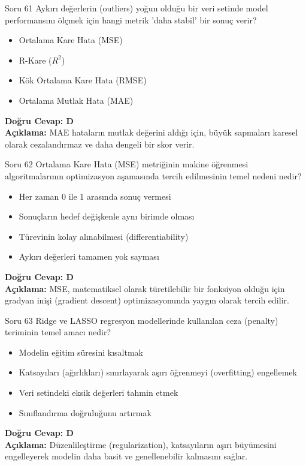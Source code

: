 \documentclass[12pt,a4paper]{article}
\begin{document}
\begin{testcard}{Soru 61}
    Aykırı değerlerin (outliers) yoğun olduğu bir veri setinde model performansını ölçmek için hangi metrik 'daha stabil' bir sonuç verir?
    \begin{itemize}
        \item[A)] Ortalama Kare Hata (MSE)
        \item[B)] R-Kare ($R^2$)
        \item[C)] Kök Ortalama Kare Hata (RMSE)
        \item[D)] Ortalama Mutlak Hata (MAE)
    \end{itemize}
    \tcblower
    \textbf{Doğru Cevap: D} \\
    \textbf{Açıklama:} MAE hataların mutlak değerini aldığı için, büyük sapmaları karesel olarak cezalandırmaz ve daha dengeli bir skor verir.
\end{testcard}

\begin{testcard}{Soru 62}
    Ortalama Kare Hata (MSE) metriğinin makine öğrenmesi algoritmalarının optimizasyon aşamasında tercih edilmesinin temel nedeni nedir?
    \begin{itemize}
        \item[A)] Her zaman 0 ile 1 arasında sonuç vermesi
        \item[B)] Sonuçların hedef değişkenle aynı birimde olması
        \item[C)] Türevinin kolay alınabilmesi (differentiability)
        \item[D)] Aykırı değerleri tamamen yok sayması
    \end{itemize}
    \tcblower
    \textbf{Doğru Cevap: D} \\
    \textbf{Açıklama:} MSE, matematiksel olarak türetilebilir bir fonksiyon olduğu için gradyan inişi (gradient descent) optimizasyonunda yaygın olarak tercih edilir.
\end{testcard}

\begin{testcard}{Soru 63}
    Ridge ve LASSO regresyon modellerinde kullanılan ceza (penalty) teriminin temel amacı nedir?
    \begin{itemize}
        \item[A)] Modelin eğitim süresini kısaltmak
        \item[B)] Katsayıları (ağırlıkları) sınırlayarak aşırı öğrenmeyi (overfitting) engellemek
        \item[C)] Veri setindeki eksik değerleri tahmin etmek
        \item[D)] Sınıflandırma doğruluğunu artırmak
    \end{itemize}
    \tcblower
    \textbf{Doğru Cevap: D} \\
    \textbf{Açıklama:} Düzenlileştirme (regularization), katsayıların aşırı büyümesini engelleyerek modelin daha basit ve genellenebilir kalmasını sağlar.
\end{testcard}
\end{document}
